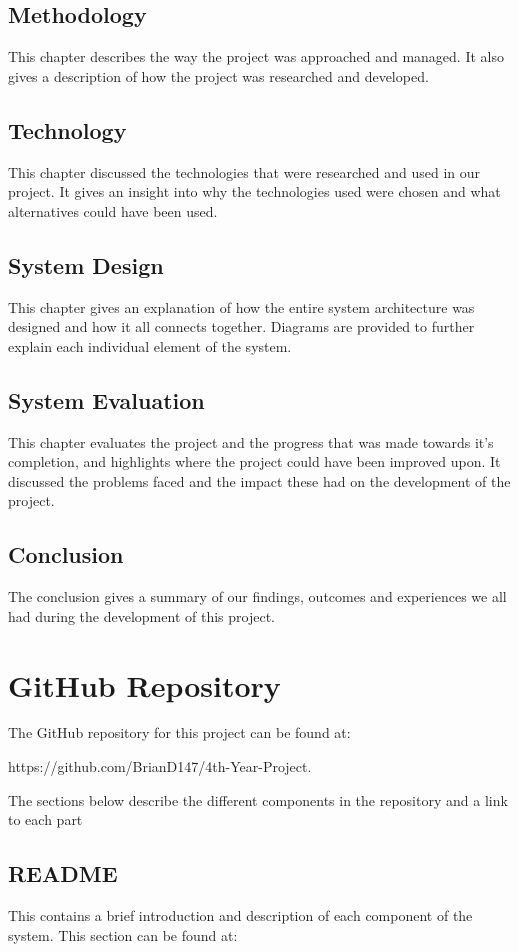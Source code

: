 \subsection{Methodology}
This chapter describes the way the project was approached and managed. It also gives a description of how the project was researched and developed.

\subsection{Technology}
This chapter discussed the technologies that were researched and used in our project. It gives an insight into why the technologies used were chosen and what alternatives could have been used.

\subsection{System Design}
This chapter gives an explanation of how the entire system architecture was designed and how it all connects together. Diagrams are provided to further explain each individual element of the system.

\subsection{System Evaluation}
This chapter evaluates the project and the progress that was made towards it's completion, and highlights where the project could have been improved upon. It discussed the problems faced and the impact these had on the development of the project.

\subsection{Conclusion}
The conclusion gives a summary of our findings, outcomes and experiences we all had during the development of this project.

\section{GitHub Repository}
The GitHub repository for this project can be found at:

    https://github.com/BrianD147/4th-Year-Project. 

The sections below describe the different components in the repository and a link to each part

\subsection{README}
This contains a brief introduction and description of each component of the system.
This section can be found at:


